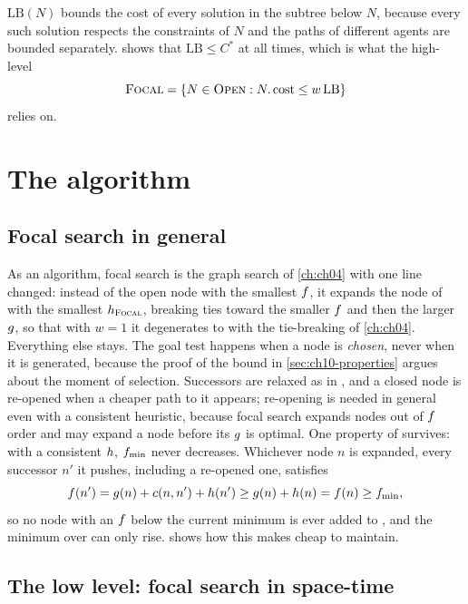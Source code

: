 $\mathrm{LB}(N)$ bounds the cost of every solution in the subtree below $N$,
because every such solution respects the constraints of $N$ and the paths of
different agents are bounded separately.  shows that
$\mathrm{LB} \le C^*$ at all times, which is what the high-level \Focal
\begin{equation}
  \textsc{Focal} = \left\{ N \in \textsc{Open} : N.\operatorname{cost} \le w\,\mathrm{LB} \right\}
  \label{eq:ch10-focal-high}
\end{equation}
relies on.

\section{The algorithm}
\label{sec:ch10-algorithm}

\subsection{Focal search in general}
\label{sec:ch10-focal-alg}

As an algorithm, focal search is the \astar graph search of \cref{ch:ch04} with
one line changed: instead of the open node with the smallest $f$, it
expands the node of \Focal with the smallest $h_{\textsc{Focal}}$, breaking ties
toward the smaller $f$ and then the larger $g$, so that with $w = 1$
it degenerates to \astar with the tie-breaking of \cref{ch:ch04}. Everything
else stays. The goal test happens when a node is \emph{chosen}, never when it
is generated, because the proof of the bound in \cref{sec:ch10-properties}
argues about the moment of selection. Successors are relaxed as in \astar, and
a closed node is re-opened when a cheaper path to it appears; re-opening is
needed in general even with a consistent heuristic, because focal search
expands nodes out of $f$ order and may expand a node before its
$g$ is optimal. One property of \astar survives: with a consistent
$h$, $f_{\min}$ never decreases. Whichever node $n$ is expanded,
every successor $n'$ it pushes, including a re-opened one, satisfies
\[
  f(n') = g(n) + c(n, n') + h(n') \ge g(n) + h(n)
  = f(n) \ge f_{\min},
\]
so no node with an $f$ below the current minimum is ever added to \Open,
and the minimum over \Open can only rise.  shows how this makes
\Focal cheap to maintain.

\subsection{The low level: focal search in space-time}
\label{sec:ch10-lowlevel}

